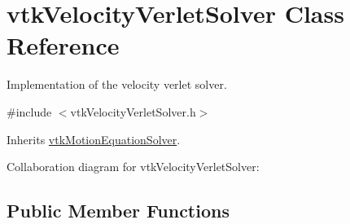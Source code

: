 \hypertarget{classvtkVelocityVerletSolver}{
\section{vtkVelocityVerletSolver Class Reference}
\label{classvtkVelocityVerletSolver}
}


Implementation of the velocity verlet solver.  




{\ttfamily \#include $<$vtkVelocityVerletSolver.h$>$}



Inherits \hyperlink{classvtkMotionEquationSolver}{vtkMotionEquationSolver}.



Collaboration diagram for vtkVelocityVerletSolver:\subsection*{Public Member Functions}
